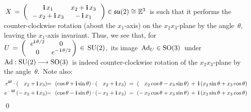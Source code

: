 \,$X
\, = \,
\left(\,\begin{array}{cc}
	\textnormal{\bf i}\,x_{1} & x_{2} + \textnormal{\bf i}\,x_{3}
	\\
	- \, x_{2} + \textnormal{\bf i}\,x_{3} & -\,\textnormal{\bf i}\,x_{1}
	\end{array}\,\right)
\in \mathfrak{su}(2) \cong \mathbb{E}^{3}$\,
is such that it performs the counter-clockwise rotation (about the $x_{1}$-axis)
on the $x_{2}x_{3}$-plane by the angle \,{\color{black}$\theta$},\, leaving the $x_{1}$-axis invariant.
Thus, we see that, for
\,$U \, = \, \left(\,\begin{array}{cc} e^{\textnormal{\bf i}\,{\color{black}\theta/2}} & 0 \\ 0 & e^{-\,\textnormal{\bf i}\,\theta/2} \end{array}\!\!\right) \,\in\, \textnormal{SU}(2)$,\,
its image
\,$\textnormal{Ad}_{U} \in \textnormal{SO}(3)$\,
under
\,$\textnormal{Ad} : \textnormal{SU}(2) \longrightarrow \textnormal{SO}(3)$\,
is indeed counter-clockwise rotation of the $x_{2}x_{3}$-plane by the angle \,{\color{black}$\theta$}.\,
Note also:
\begin{eqnarray*}
e^{\i\theta} \cdot ({\color{white}-}\,x_{2}+\i\,x_{3})
& \!\!=\!\! &
	(\cos\theta + \i\sin\theta) \cdot ({\color{white}-}\,x_{2}+\i\,x_{3})
\; = \;
	({\color{white}-}\,x_{2}\cos\theta - x_{3}\sin\theta) \,+\, \i\,(x_{2}\sin\theta + x_{3}\cos\theta)
\\
e^{-\,\i\theta}\,(-\,x_{2}+\i\,x_{3})
& \!\!=\!\! &
	(\cos\theta - \i\sin\theta) \cdot ({\color{black}-}\,x_{2}+\i\,x_{3})
\; = \;
	(-\,x_{2}\cos\theta + x_{3}\sin\theta) \,+\, \i\,(x_{2}\sin\theta + x_{3}\cos\theta)
\end{eqnarray*}
\qed


